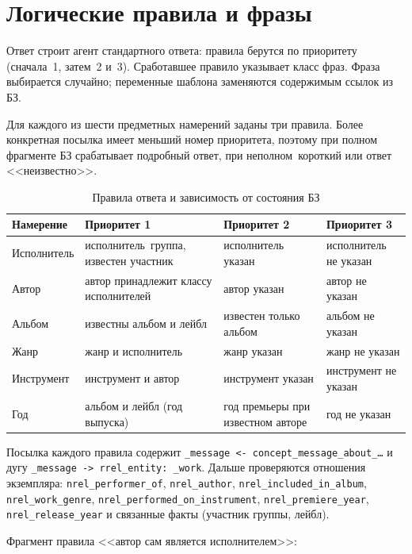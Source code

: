 \section{Логические правила и фразы}
\label{sec:work}

Ответ строит агент стандартного ответа: правила берутся по приоритету (сначала~1, затем~2 и~3). Сработавшее правило указывает класс фраз. Фраза выбирается случайно; переменные шаблона заменяются содержимым ссылок из БЗ.

Для каждого из шести предметных намерений заданы три правила. Более конкретная посылка имеет меньший номер приоритета, поэтому при полном фрагменте БЗ срабатывает подробный ответ, при неполном~\mdash  короткий или ответ <<неизвестно>>.

\begin{table}[H]
	\centering
	\small
	\begin{tabular}{|p{2.4cm}|p{3.4cm}|p{3.4cm}|p{3.0cm}|}
		\hline
		Намерение & Приоритет 1 & Приоритет 2 & Приоритет 3 \\
		\hline
		Исполнитель & исполнитель~\mdash  группа, известен участник & исполнитель указан & исполнитель не указан \\
		\hline
		Автор & автор принадлежит классу исполнителей & автор указан & автор не указан \\
		\hline
		Альбом & известны альбом и лейбл & известен только альбом & альбом не указан \\
		\hline
		Жанр & жанр и исполнитель & жанр указан & жанр не указан \\
		\hline
		Инструмент & инструмент и автор & инструмент указан & инструмент не указан \\
		\hline
		Год & альбом и лейбл (год выпуска) & год премьеры при известном авторе & год не указан \\
		\hline
	\end{tabular}
	\caption{Правила ответа и зависимость от состояния БЗ}
	\label{tab:rules}
\end{table}

Посылка каждого правила содержит \texttt{\_message <- concept\_message\_about\_\ldots} и дугу \texttt{\_message -> rrel\_entity: \_work}. Дальше проверяются отношения экземпляра: \texttt{nrel\_performer\_of}, \texttt{nrel\_author}, \texttt{nrel\_included\_in\_album}, \texttt{nrel\_work\_genre}, \texttt{nrel\_performed\_on\_instrument}, \texttt{nrel\_premiere\_year}, \texttt{nrel\_release\_year} и связанные факты (участник группы, лейбл).

Фрагмент правила <<автор сам является исполнителем>>:

